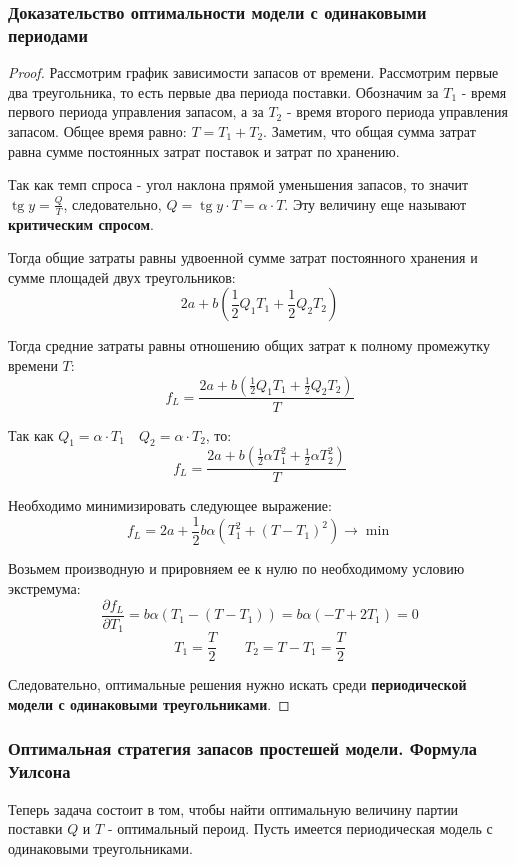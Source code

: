 \documentclass[aps,%
12pt,%
final,%
oneside,
onecolumn,%
musixtex, %
superscriptaddress,%
centertags]{article} %
\theoremstyle{plain}
\theoremstyle{definition}
\theoremstyle{remark}
\begin{document}
\subsubsection{Доказательство оптимальности модели с одинаковыми периодами}
\begin{proof}

	Рассмотрим график зависимости запасов от времени. Рассмотрим первые два треугольника, то есть первые два периода поставки. Обозначим за $T_1$ - время первого периода управления запасом, а за $T_2$ - время второго периода управления запасом. Общее время равно: $T = T_1+T_2$. Заметим, что общая сумма затрат равна сумме постоянных затрат поставок и затрат по хранению.

	Так как темп спроса - угол наклона прямой уменьшения запасов, то значит $\operatorname{tg} y = \frac{Q}{T}$, следовательно, $Q = \operatorname{tg} y \cdot T = \alpha \cdot T$. Эту величину еще называют \textbf{критическим спросом}.

	Тогда общие затраты равны удвоенной сумме затрат постоянного хранения и сумме площадей двух треугольников:
	$$2a + b\left(\frac{1}{2}Q_1T_1+\frac{1}{2}Q_2T_2\right)$$

	Тогда средние затраты равны отношению общих затрат к полному промежутку времени $T$:
	$$f_L = \frac{2a + b\left(\frac{1}{2}Q_1T_1+\frac{1}{2}Q_2T_2\right)}{T}$$

	Так как $Q_1 = \alpha \cdot T_1 \quad Q_2 = \alpha \cdot T_2$, то:
	$$f_L= \frac{2a + b(\frac{1}{2}\alpha T_1^2+\frac{1}{2} \alpha T_2^2)}{T}$$

	Необходимо минимизировать следующее выражение:
	$$f_L = 2a + \frac{1}{2}b\alpha(T_1^2+(T-T_1)^2) \to \min$$

	Возьмем производную и прировняем ее к нулю по необходимому условию экстремума:
	$$\frac{\partial f_L}{\partial T_1} = b\alpha(T_1 - (T-T_1)) = b\alpha (-T + 2T_1)=0$$
	$$T_1 = \frac{T}{2} \qquad T_2 = T - T_1 = \frac{T}{2}$$

	Следовательно, оптимальные решения нужно искать среди \textbf{периодической модели с одинаковыми треугольниками}.
\end{proof}

\subsubsection{Оптимальная стратегия запасов простешей модели. Формула Уилсона}

Теперь задача состоит в том, чтобы найти оптимальную величину партии поставки $Q$ и $T$ - оптимальный пероид. Пусть имеется периодическая модель с одинаковыми треугольниками.
\end{document}
